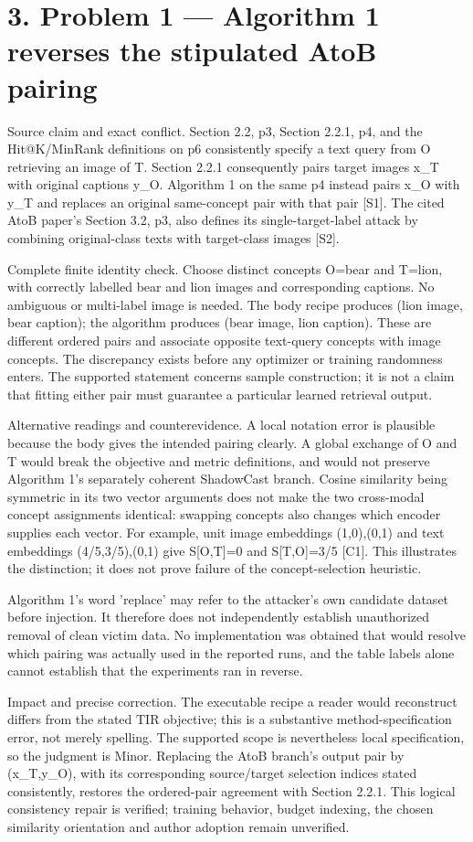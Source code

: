 \documentclass[10pt]{article}
\begin{document}
\section*{3. Problem 1 — Algorithm 1 reverses the stipulated AtoB pairing}
Source claim and exact conflict. Section 2.2, p3, Section 2.2.1, p4, and the Hit@K/MinRank definitions on p6 consistently specify a text query from O retrieving an image of T. Section 2.2.1 consequently pairs target images x\_T with original captions y\_O. Algorithm 1 on the same p4 instead pairs x\_O with y\_T and replaces an original same-concept pair with that pair [S1]. The cited AtoB paper’s Section 3.2, p3, also defines its single-target-label attack by combining original-class texts with target-class images [S2].\par
Complete finite identity check. Choose distinct concepts O=bear and T=lion, with correctly labelled bear and lion images and corresponding captions. No ambiguous or multi-label image is needed. The body recipe produces (lion image, bear caption); the algorithm produces (bear image, lion caption). These are different ordered pairs and associate opposite text-query concepts with image concepts. The discrepancy exists before any optimizer or training randomness enters. The supported statement concerns sample construction; it is not a claim that fitting either pair must guarantee a particular learned retrieval output.\par
Alternative readings and counterevidence. A local notation error is plausible because the body gives the intended pairing clearly. A global exchange of O and T would break the objective and metric definitions, and would not preserve Algorithm 1’s separately coherent ShadowCast branch. Cosine similarity being symmetric in its two vector arguments does not make the two cross-modal concept assignments identical: swapping concepts also changes which encoder supplies each vector. For example, unit image embeddings (1,0),(0,1) and text embeddings (4/5,3/5),(0,1) give S[O,T]=0 and S[T,O]=3/5 [C1]. This illustrates the distinction; it does not prove failure of the concept-selection heuristic.\par
Algorithm 1’s word ’replace’ may refer to the attacker’s own candidate dataset before injection. It therefore does not independently establish unauthorized removal of clean victim data. No implementation was obtained that would resolve which pairing was actually used in the reported runs, and the table labels alone cannot establish that the experiments ran in reverse.\par
Impact and precise correction. The executable recipe a reader would reconstruct differs from the stated TIR objective; this is a substantive method-specification error, not merely spelling. The supported scope is nevertheless local specification, so the judgment is Minor. Replacing the AtoB branch’s output pair by (x\_T,y\_O), with its corresponding source/target selection indices stated consistently, restores the ordered-pair agreement with Section 2.2.1. This logical consistency repair is verified; training behavior, budget indexing, the chosen similarity orientation and author adoption remain unverified.\par
\end{document}
